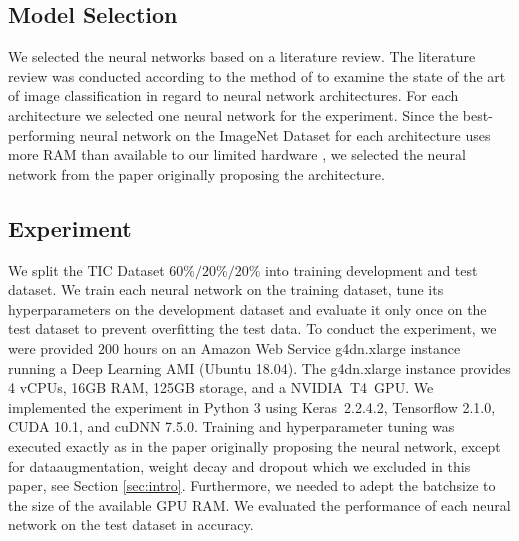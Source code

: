 \documentclass[a4paper, 10pt, journal]{wissarbIEEE}
\begin{document}
\subsection{Model Selection}
We selected the neural networks based on a literature review. The literature review was conducted according to the method of \cite{Webster.2002} to examine the state of the art of image classification in regard to neural network architectures. For each architecture we selected one neural network for the experiment. Since the best-performing neural network on the ImageNet Dataset for each architecture uses more RAM than available to our limited hardware \cite{Foret.2020, Kolesnikov.2019, Touvron.2019}, we selected the neural network from the paper originally proposing the architecture.

\subsection{Experiment}
We split the TIC Dataset $60\%/20\%/20\%$ into training development and test dataset.
We train each neural network on the training dataset, tune its hyperparameters on the development dataset and evaluate it only once on the test dataset to prevent overfitting the test data. To conduct the experiment, we were provided $200$ hours on an Amazon Web Service g4dn.xlarge instance running a Deep Learning AMI (Ubuntu 18.04).\cite{AWS.2020a}
The g4dn.xlarge instance provides 4 \mbox{vCPUs}, 16GB RAM, 125GB storage, and a NVIDIA~T4~GPU. \cite{AWS.2020b} 
We implemented the experiment in Python 3\cite{Python3} using Keras~2.2.4.2\cite{Keras}, Tensorflow 2.1.0\cite{Tensorflow.2015}, CUDA 10.1\cite{CUDA}, and cuDNN 7.5.0\cite{cuDNN}.
Training and hyperparameter tuning was executed exactly as in the paper originally proposing the neural network, except for dataaugmentation, weight decay and dropout which we excluded in this paper, see Section \ref{sec:intro}. Furthermore, we needed to adept the batchsize to the size of the available GPU RAM. We evaluated the performance of each neural network on the test dataset in accuracy.
\end{document}
